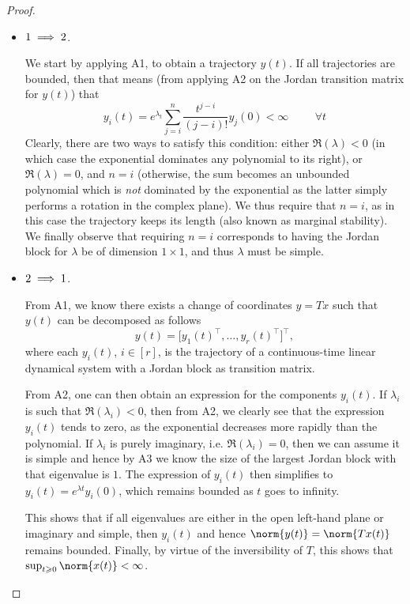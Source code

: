 \documentclass[11pt]{article}
\begin{document}
\begin{proof}\leavevmode
\begin{itemize}
	\item \(\textnormal{1} \implies \textnormal{2}\).
	
	We start by applying A1, to obtain a trajectory \(y(t)\).
	If all trajectories are bounded, then that means (from applying A2 on the Jordan transition matrix for \(y(t)\)) that
	\[
	y_i(t) = e^{\lambda_t} \sum_{j = i}^n \frac{t^{j - i}}{(j - i)!} y_j(0) < \infty \hspace{1cm} \forall t %
	\]
	Clearly, there are two ways to satisfy this condition: either \(\Re(\lambda) < 0\) (in which case the exponential dominates any polynomial to its right), or \(\Re(\lambda) = 0\), and \(n = i\) (otherwise, the sum becomes an unbounded polynomial which is \textit{not} dominated by the exponential as the latter simply performs a rotation in the complex plane).
	We thus require that \(n = i\), as in this case the trajectory keeps its length (also known as marginal stability).
	We finally observe that requiring \(n = i\) corresponds to having the Jordan block for \(\lambda\) be of dimension \(1 \times 1\), and thus \(\lambda\) must be simple.
	\item \(\textnormal{2} \implies \textnormal{1}\).

	From A1, we know there exists a change of coordinates $y=Tx$ such that $y(t)$ can be decomposed as follows
	\[
	y(t) = \big[y_1(t)^\top, \dots, y_r(t)^\top\big]^\top,
	\]
	where each $y_i(t)$, $i \in [r]$, is the trajectory of a continuous-time linear dynamical system with a Jordan block as transition matrix.
	
	From A2, one can then obtain an expression for the components $y_i(t)$.
	If $\lambda_i$ is such that $\Re(\lambda_i)<0$, then from A2, we clearly see that the expression $y_i(t)$ tends to zero, as the exponential decreases more rapidly than the polynomial.
	If $\lambda_i$ is purely imaginary, i.e. $\Re(\lambda_i) = 0$, then we can assume it is simple and hence by A3 we know the size of the largest Jordan block with that eigenvalue is \(1\).
	The expression of $y_i(t)$ then simplifies to $y_i(t)=e^{\lambda t} y_i(0)$, which remains bounded as \(t\) goes to infinity. %
	
	This shows that if all eigenvalues are either in the open left-hand plane or imaginary and simple, then $y_i(t)$ and hence $\norm{y(t)}=\norm{Tx(t)}$ remains bounded.
	Finally, by virtue of the inversibility of \(T\), this shows that \(\sup_{t \geqslant 0} \norm{x(t)} < \infty\).\qedhere
\end{itemize}
\end{proof}
\end{document}
